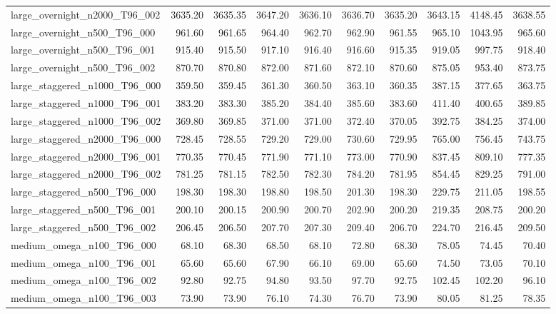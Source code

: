 \begin{table}[htbp]
\begin{tabular}{lrrrrrrrrr}
large\_overnight\_n2000\_T96\_002 & 3635.20 & 3635.35 & 3647.20 & 3636.10 & 3636.70 & 3635.20 & 3643.15 & 4148.45 & 3638.55 \\
large\_overnight\_n500\_T96\_000 & 961.60 & 961.65 & 964.40 & 962.70 & 962.90 & 961.55 & 965.10 & 1043.95 & 965.60 \\
large\_overnight\_n500\_T96\_001 & 915.40 & 915.50 & 917.10 & 916.40 & 916.60 & 915.35 & 919.05 & 997.75 & 918.40 \\
large\_overnight\_n500\_T96\_002 & 870.70 & 870.80 & 872.00 & 871.60 & 872.10 & 870.60 & 875.05 & 953.40 & 873.75 \\
large\_staggered\_n1000\_T96\_000 & 359.50 & 359.45 & 361.30 & 360.50 & 363.10 & 360.35 & 387.15 & 377.65 & 363.75 \\
large\_staggered\_n1000\_T96\_001 & 383.20 & 383.30 & 385.20 & 384.40 & 385.60 & 383.60 & 411.40 & 400.65 & 389.85 \\
large\_staggered\_n1000\_T96\_002 & 369.80 & 369.85 & 371.00 & 371.00 & 372.40 & 370.05 & 392.75 & 384.25 & 374.00 \\
large\_staggered\_n2000\_T96\_000 & 728.45 & 728.55 & 729.20 & 729.00 & 730.60 & 729.95 & 765.00 & 756.45 & 743.75 \\
large\_staggered\_n2000\_T96\_001 & 770.35 & 770.45 & 771.90 & 771.10 & 773.00 & 770.90 & 837.45 & 809.10 & 777.35 \\
large\_staggered\_n2000\_T96\_002 & 781.25 & 781.15 & 782.50 & 782.30 & 784.20 & 781.95 & 854.45 & 829.25 & 791.00 \\
large\_staggered\_n500\_T96\_000 & 198.30 & 198.30 & 198.80 & 198.50 & 201.30 & 198.30 & 229.75 & 211.05 & 198.55 \\
large\_staggered\_n500\_T96\_001 & 200.10 & 200.15 & 200.90 & 200.70 & 202.90 & 200.20 & 219.35 & 208.75 & 200.20 \\
large\_staggered\_n500\_T96\_002 & 206.45 & 206.50 & 207.70 & 207.30 & 209.40 & 206.70 & 224.70 & 216.45 & 209.50 \\
medium\_omega\_n100\_T96\_000 & 68.10 & 68.30 & 68.50 & 68.10 & 72.80 & 68.30 & 78.05 & 74.45 & 70.40 \\
medium\_omega\_n100\_T96\_001 & 65.60 & 65.60 & 67.90 & 66.10 & 69.00 & 65.60 & 74.50 & 73.05 & 70.10 \\
medium\_omega\_n100\_T96\_002 & 92.80 & 92.75 & 94.80 & 93.50 & 97.70 & 92.75 & 102.45 & 102.20 & 96.10 \\
medium\_omega\_n100\_T96\_003 & 73.90 & 73.90 & 76.10 & 74.30 & 76.70 & 73.90 & 80.05 & 81.25 & 78.35 \\

\end{tabular}
\end{table}
